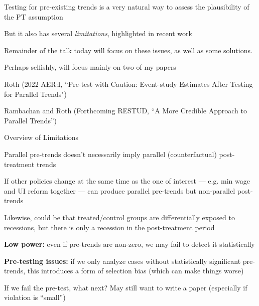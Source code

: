 \documentclass[aspectratio = 169, 13pt]{beamer}
\begin{document}
\begin{frame}
	
	\begin{wideitemize}
		
	\item
	Testing for pre-existing trends is a very natural way to assess the plausibility of the PT assumption
	
	\item
	But it also has several \textit{limitations}, highlighted in recent work \citep[][]{freyaldenhoven_pre-event_2019, kahn-lang_promise_2020, bilinski_seeking_2018, roth_pre-test_2021}
	
	\item
	Remainder of the talk today will focus on these issues, as well as some solutions. 
	
	\item
	Perhaps selfishly, will focus mainly on two of my papers
	
	\begin{wideitemize}
		\item
		Roth (2022 AER:I, ``Pre-test with Caution: Event-study Estimates After Testing for Parallel Trends") 
		\item
		Rambachan and Roth (Forthcoming RESTUD, ``A More Credible Approach to Parallel Trends'') 
	\end{wideitemize}
	
	
	\end{wideitemize}

	
\end{frame}


\begin{frame}{Overview of Limitations}
	\begin{wideitemize}
		\item
		Parallel pre-trends doesn't necessarily imply parallel (counterfactual) post-treatment trends
			\begin{wideitemize}
				\item
				If other policies change at the same time as the one of interest --- e.g. min wage and UI reform together --- can produce parallel pre-trends but non-parallel post-trends
				
				\item
				Likewise, could be that treated/control groups are differentially exposed to recessions, but there is only a recession in the post-treatment period
			\end{wideitemize}
		
		\pause
		\item
		\textbf{Low power:} even if pre-trends are non-zero, we may fail to detect it statistically
		
		\pause
		\item
		\textbf{Pre-testing issues:} if we only analyze cases without statistically significant pre-trends, this introduces a form of selection bias (which can make things worse) 
		
		\pause
		\item
		If we fail the pre-test, what next? May still want to write a paper (especially if violation is ``small'')
	\end{wideitemize}
\end{frame}
\end{document}
